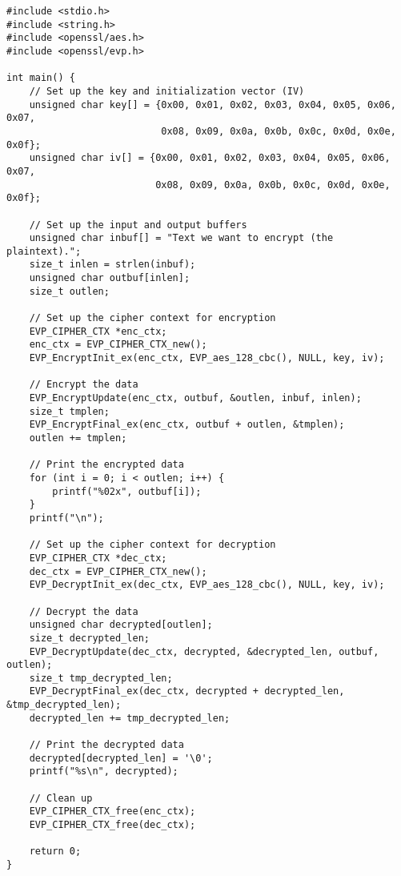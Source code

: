 \documentclass{article}
\begin{document}
\begin{lstlisting}
#include <stdio.h>
#include <string.h>
#include <openssl/aes.h>
#include <openssl/evp.h>

int main() {
    // Set up the key and initialization vector (IV)
    unsigned char key[] = {0x00, 0x01, 0x02, 0x03, 0x04, 0x05, 0x06, 0x07,
                           0x08, 0x09, 0x0a, 0x0b, 0x0c, 0x0d, 0x0e, 0x0f};
    unsigned char iv[] = {0x00, 0x01, 0x02, 0x03, 0x04, 0x05, 0x06, 0x07,
                          0x08, 0x09, 0x0a, 0x0b, 0x0c, 0x0d, 0x0e, 0x0f};

    // Set up the input and output buffers
    unsigned char inbuf[] = "Text we want to encrypt (the plaintext).";
    size_t inlen = strlen(inbuf);
    unsigned char outbuf[inlen];
    size_t outlen;

    // Set up the cipher context for encryption
    EVP_CIPHER_CTX *enc_ctx;
    enc_ctx = EVP_CIPHER_CTX_new();
    EVP_EncryptInit_ex(enc_ctx, EVP_aes_128_cbc(), NULL, key, iv);

    // Encrypt the data
    EVP_EncryptUpdate(enc_ctx, outbuf, &outlen, inbuf, inlen);
    size_t tmplen;
    EVP_EncryptFinal_ex(enc_ctx, outbuf + outlen, &tmplen);
    outlen += tmplen;

    // Print the encrypted data
    for (int i = 0; i < outlen; i++) {
        printf("%02x", outbuf[i]);
    }
    printf("\n");

    // Set up the cipher context for decryption
    EVP_CIPHER_CTX *dec_ctx;
    dec_ctx = EVP_CIPHER_CTX_new();
    EVP_DecryptInit_ex(dec_ctx, EVP_aes_128_cbc(), NULL, key, iv);

    // Decrypt the data
    unsigned char decrypted[outlen];
    size_t decrypted_len;
    EVP_DecryptUpdate(dec_ctx, decrypted, &decrypted_len, outbuf, outlen);
    size_t tmp_decrypted_len;
    EVP_DecryptFinal_ex(dec_ctx, decrypted + decrypted_len, &tmp_decrypted_len);
    decrypted_len += tmp_decrypted_len;

    // Print the decrypted data
    decrypted[decrypted_len] = '\0';
    printf("%s\n", decrypted);

    // Clean up
    EVP_CIPHER_CTX_free(enc_ctx);
    EVP_CIPHER_CTX_free(dec_ctx);

    return 0;
}
\end{lstlisting}
\end{document}
